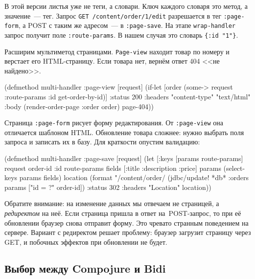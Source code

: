 В этой версии листья уже не теги, а словари. Ключ каждого словаря это метод, а
значение~--- тег. Запрос \verb|GET /content/order/1/edit| разрешается в тег
\verb|:page-form|, а POST с таким же адресом~--- в \verb|:page-save|.  На
этапе \verb|wrap-handler| запрос получит поле \verb|:route-params|.  В нашем
случая это словарь \verb|{:id "1"}|.


Расширим мультиметод страницами. \verb|Page-view| находит товар по номеру и
верстает его HTML-страницу. Если товара нет, вернём ответ 404 <<не
найдено>>.

\begin{english}
  \begin{clojure}
(defmethod multi-handler :page-view
  [request]
  (if-let [order (some-> request
                         :route-params
                         :id
                         get-order-by-id)]
    {:status 200
     :headers {"content-type" "text/html"}
     :body (render-order-page {:order order})}
    page-404))
  \end{clojure}
\end{english}

Страница \verb|:page-form| рисует форму редактирования. От \verb|:page-view|
она отличается шаблоном HTML. Обновление товара сложнее: нужно выбрать поля
запроса и записать их в базу. Для краткости опустим валидацию:

\begin{english}
  \begin{clojure}
(defmethod multi-handler :page-save
  [request]
  (let [{:keys [params route-params]} request
        {order-id :id} route-params
        fields [:title :description :price]
        params (select-keys params fields)
        location (format "/content/order/%
    (jdbc/update! *db* :orders params ["id = ?" order-id])
    {:status 302
     :headers {"Location" location}}))
  \end{clojure}
\end{english}


Обратите внимание: на изменение данных мы отвечаем не страницей, а
\emph{редиректом} на неё. Если страница пришла в ответ на~POST-запрос, то
при её обновлении браузер снова отправит форму. Это чревато странным
поведением на сервере. Вариант с редиректом решает проблему: браузер загрузит
страницу через GET, и побочных эффектов при обновлении не будет.

\subsection{Выбор между Compojure и Bidi}

